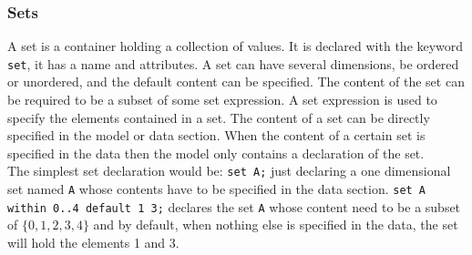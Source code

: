 \subsubsection{Sets}
A set is a container holding a collection of values. It is declared with the keyword \verb=set=, it has a name and attributes. A set can have several dimensions, be ordered or unordered, and the default content can be specified. The content of the set can be required to be a subset of some set expression. A set expression is used to specify the elements contained in a set. The content of a set can be directly specified in the model or data section. When the content of a certain set is specified in the data then the model only contains a declaration of the set.\\
The simplest set declaration would be: \verb=set A;= just declaring a one dimensional set named \verb=A= whose contents have to be specified in the data section. 
\verb&set A within 0..4 default 1 3;& declares the set \verb=A= whose content need to be a subset of $\lbrace 0,1,2,3,4\rbrace$ and by default, when nothing else is specified in the data, the set will hold the elements 1 and 3.
